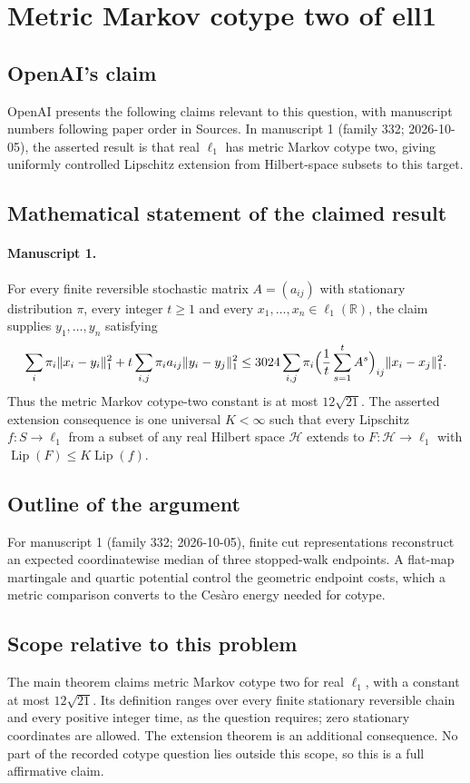 \documentclass[11pt]{article}
\begin{document}
\section*{Metric Markov cotype two of ell1}

\subsection{OpenAI's claim}
OpenAI presents the following claims relevant to this question, with manuscript numbers following paper order in Sources. In manuscript 1 (family 332; 2026-10-05), the asserted result is that real $\ell_1$ has metric Markov cotype two, giving uniformly controlled Lipschitz extension from Hilbert-space subsets to this target.

\subsection{Mathematical statement of the claimed result}
\paragraph{Manuscript 1.}
For every finite reversible stochastic matrix $A=(a_{ij})$ with stationary distribution $\pi$, every integer $t\ge1$ and every $x_1,\ldots,x_n\in\ell_1(\mathbb R)$, the claim supplies $y_1,\ldots,y_n$ satisfying
\[
 \sum_i\pi_i\|x_i-y_i\|_1^2+t\sum_{i,j}\pi_i a_{ij}\|y_i-y_j\|_1^2
 \le3024\sum_{i,j}\pi_i\Bigl(\frac1t\sum_{s=1}^tA^s\Bigr)_{ij}\|x_i-x_j\|_1^2.
\]
Thus the metric Markov cotype-two constant is at most $12\sqrt{21}$. The asserted extension consequence is one universal $K<\infty$ such that every Lipschitz $f:S\to\ell_1$ from a subset of any real Hilbert space $\mathcal H$ extends to $F:\mathcal H\to\ell_1$ with $\operatorname{Lip}(F)\le K\operatorname{Lip}(f)$.

\subsection{Outline of the argument}
For manuscript 1 (family 332; 2026-10-05), finite cut representations reconstruct an expected coordinatewise median of three stopped-walk endpoints. A flat-map martingale and quartic potential control the geometric endpoint costs, which a metric comparison converts to the Ces\`aro energy needed for cotype.

\subsection{Scope relative to this problem}
The main theorem claims metric Markov cotype two for real $\ell_1$, with a constant at most $12\sqrt{21}$. Its definition ranges over every finite stationary reversible chain and every positive integer time, as the question requires; zero stationary coordinates are allowed. The extension theorem is an additional consequence. No part of the recorded cotype question lies outside this scope, so this is a full affirmative claim.
\end{document}
